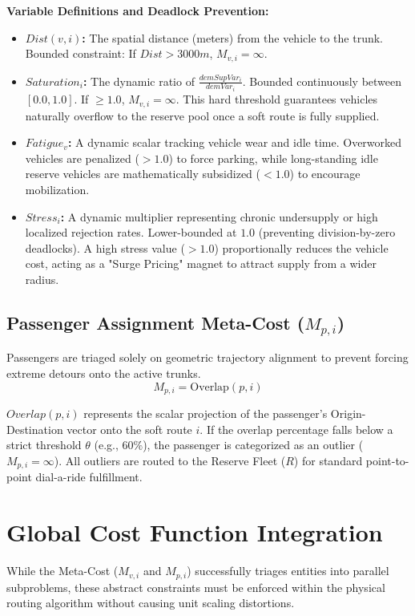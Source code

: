 \documentclass[12pt,a4paper]{article}
\begin{document}
\textbf{Variable Definitions and Deadlock Prevention:}
\begin{itemize}
    \item \textbf{$Dist(v, i)$:} The spatial distance (meters) from the vehicle to the trunk. Bounded constraint: If $Dist > 3000m$, $M_{v, i} = \infty$.
    \item \textbf{$Saturation_i$:} The dynamic ratio of $\frac{demSupVar_i}{demVar_i}$. Bounded continuously between $[0.0, 1.0]$. If $\geq 1.0$, $M_{v,i} = \infty$. This hard threshold guarantees vehicles naturally overflow to the reserve pool once a soft route is fully supplied.
    \item \textbf{$Fatigue_v$:} A dynamic scalar tracking vehicle wear and idle time. Overworked vehicles are penalized ($>1.0$) to force parking, while long-standing idle reserve vehicles are mathematically subsidized ($<1.0$) to encourage mobilization.
    \item \textbf{$Stress_i$:} A dynamic multiplier representing chronic undersupply or high localized rejection rates. Lower-bounded at $1.0$ (preventing division-by-zero deadlocks). A high stress value ($>1.0$) proportionally reduces the vehicle cost, acting as a "Surge Pricing" magnet to attract supply from a wider radius.
\end{itemize}

\subsection[Passenger Assignment Meta-Cost (M p,i)]{Passenger Assignment Meta-Cost ($M_{p, i}$)}
Passengers are triaged solely on geometric trajectory alignment to prevent forcing extreme detours onto the active trunks.
\begin{equation}
    M_{p, i} = \text{Overlap}(p, i)
\end{equation}

\textbf{$Overlap(p, i)$} represents the scalar projection of the passenger's Origin-Destination vector onto the soft route $i$. If the overlap percentage falls below a strict threshold $\theta$ (e.g., $60\%$), the passenger is categorized as an outlier ($M_{p, i} = \infty$). All outliers are routed to the Reserve Fleet ($R$) for standard point-to-point dial-a-ride fulfillment.
\section{Global Cost Function Integration}
While the Meta-Cost ($M_{v, i}$ and $M_{p, i}$) successfully triages entities into parallel subproblems, these abstract constraints must be enforced within the physical routing algorithm without causing unit scaling distortions.
\end{document}
